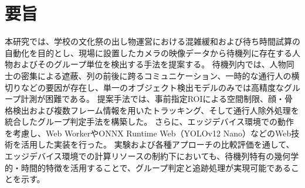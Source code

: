 \section*{要旨}

本研究では、学校の文化祭の出し物運営における混雑緩和および待ち時間試算の自動化を目的とし、現場に設置したカメラの映像データから待機列に存在する人物およびそのグループ単位を検出する手法を提案する。
待機列内では、人物同士の密集による遮蔽、列の前後に跨るコミュニケーション、一時的な通行人の横切りなどの要因が存在し、単一のオブジェクト検出モデルのみでは高精度なグループ計測が困難である。
提案手法では、事前指定ROIによる空間制限、顔・骨格検出および複数フレーム情報を用いたトラッキング、そして通行人除外処理を統合したグループ判定手法を構築した。
さらに、エッジデバイス環境での動作を考慮し、Web WorkerやONNX Runtime Web（YOLOv12 Nano）などのWeb技術を活用した実装を行った。
実験および各種アプローチの比較評価を通して、エッジデバイス環境での計算リソースの制約下においても、待機列特有の幾何学的・時間的特徴を活用することで、グループ判定と追跡処理が実現可能であることを示す。
